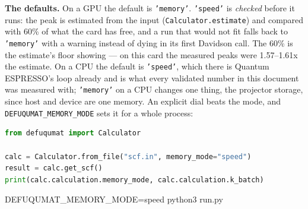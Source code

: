 \documentclass[11pt,a4paper]{article}
\newcommand{\qe}{Quantum ESPRESSO}
\newcommand{\code}[1]{\texttt{\small #1}}
\begin{document}
\textbf{The defaults.} On a GPU the default is \code{'memory'}. \code{'speed'}
is \emph{checked} before it runs: the peak is estimated from the input
(\code{Calculator.estimate}) and compared with 60\% of what the card has free,
and a run that would not fit falls back to \code{'memory'} with a warning
instead of dying in its first Davidson call. The 60\% is the estimate's floor
showing --- on this card the measured peaks were 1.57--1.61x the estimate. On a
CPU the default is \code{'speed'}, which there is \qe's loop already and is what
every validated number in this document was measured with; \code{'memory'} on a
CPU changes one thing, the projector storage, since host and device are one
memory. An explicit dial beats the mode, and \code{DEFUQUMAT\_MEMORY\_MODE} sets
it for a whole process:

\begin{lstlisting}[language=Python]
from defuqumat import Calculator

calc = Calculator.from_file("scf.in", memory_mode="speed")
result = calc.get_scf()
print(calc.calculation.memory_mode, calc.calculation.k_batch)
\end{lstlisting}

\begin{shcode}
DEFUQUMAT_MEMORY_MODE=speed python3 run.py
\end{shcode}
\end{document}
